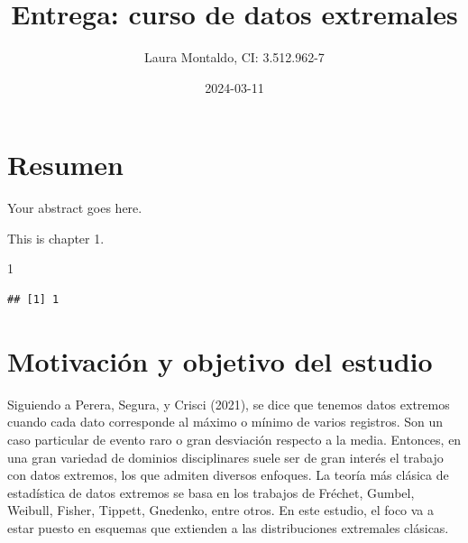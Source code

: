\documentclass[
  oneside]{article}
\title{Entrega: curso de datos extremales}
\author{Laura Montaldo, CI: 3.512.962-7}
\date{2024-03-11}
\newenvironment{Shaded}{\begin{snugshade}}{\end{snugshade}}
\newcommand{\DecValTok}[1]{\textcolor[rgb]{0.00,0.00,0.81}{#1}}
\begin{document}
\maketitle

\newtheorem{theorem}{Teorema}[section]

\newpage

\thispagestyle{empty}

\maketitle

\newpage

\tableofcontents

\newpage

\hypertarget{resumen}{%
\section{Resumen}\label{resumen}}

Your abstract goes here.

\newpage

This is chapter 1.

\begin{Shaded}
\begin{Highlighting}[]
\DecValTok{1}
\end{Highlighting}
\end{Shaded}

\begin{verbatim}
## [1] 1
\end{verbatim}

\section{Motivación y objetivo del estudio}

Siguiendo a Perera, Segura, y Crisci (2021), se dice que tenemos datos
extremos cuando cada dato corresponde al máximo o mínimo de varios
registros. Son un caso particular de evento raro o gran desviación
respecto a la media. Entonces, en una gran variedad de dominios
disciplinares suele ser de gran interés el trabajo con datos extremos,
los que admiten diversos enfoques. La teoría más clásica de estadística
de datos extremos se basa en los trabajos de Fréchet, Gumbel, Weibull,
Fisher, Tippett, Gnedenko, entre otros. En este estudio, el foco va a
estar puesto en esquemas que extienden a las distribuciones extremales
clásicas.
\end{document}
